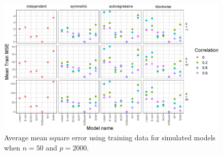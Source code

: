\documentclass{article}
\begin{document}
\begin{figure}[h!]
	\centering
	\includegraphics[width = \textwidth]{images/facet-train-mse/facet_train_mse_50_2000.eps}
	\captionsetup{width = 0.8\textwidth}
	\caption{Average mean square error using training data for simulated models when $n = 50$ and $p = 2000$.}
	\label{fig:train-mse-50-2000}
\end{figure}
\end{document}
